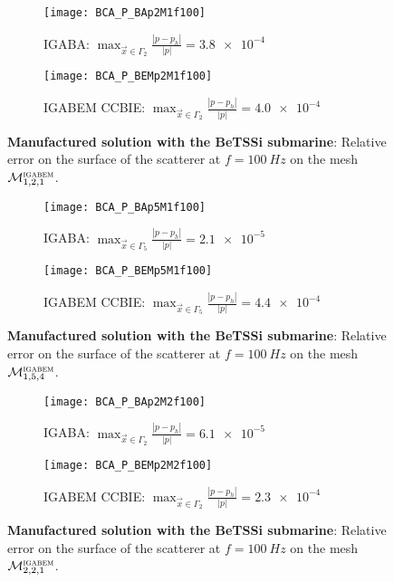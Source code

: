 \begin{figure}
	\centering
	\begin{subfigure}[t]{\textwidth}
		\texttt{[image: BCA\_P\_BAp2M1f100]}
		\caption{IGABA: $\displaystyle \max_{\vec{x}\in\Gamma_2}\frac{|p-p_h|}{|p|} = \num{3.8e-4}$}
	\end{subfigure} 
	\par\bigskip
	\begin{subfigure}[t]{\textwidth}
		\texttt{[image: BCA\_P\_BEMp2M1f100]}
		\caption{IGABEM CCBIE: $\displaystyle \max_{\vec{x}\in\Gamma_2}\frac{|p-p_h|}{|p|} = \num{4.0e-4}$}
	\end{subfigure} 
	\caption{\textbf{Manufactured solution with the BeTSSi submarine}: Relative error on the surface of the scatterer at $f=\SI{100}{Hz}$ on the mesh ${\cal M}_{1,2,1}^{\textsc{igabem}}$.}
	\label{Fig3:BCA_P_p2M1f100}
\end{figure}


\begin{figure}
	\centering
	\begin{subfigure}[t]{\textwidth}
		\texttt{[image: BCA\_P\_BAp5M1f100]}
		\caption{IGABA: $\displaystyle \max_{\vec{x}\in\Gamma_5}\frac{|p-p_h|}{|p|} = \num{2.1e-5}$}
	\end{subfigure} 
	\par\bigskip
	\begin{subfigure}[t]{\textwidth}
		\texttt{[image: BCA\_P\_BEMp5M1f100]}
		\caption{IGABEM CCBIE: $\displaystyle \max_{\vec{x}\in\Gamma_5}\frac{|p-p_h|}{|p|} = \num{4.4e-4}$}
	\end{subfigure} 
	\caption{\textbf{Manufactured solution with the BeTSSi submarine}: Relative error on the surface of the scatterer at $f=\SI{100}{Hz}$ on the mesh ${\cal M}_{1,5,4}^{\textsc{igabem}}$.}
	\label{Fig3:BCA_P_p5M1f100}
\end{figure}


\begin{figure}
	\centering
	\begin{subfigure}[t]{\textwidth}
		\texttt{[image: BCA\_P\_BAp2M2f100]}
		\caption{IGABA: $\displaystyle \max_{\vec{x}\in\Gamma_2}\frac{|p-p_h|}{|p|} = \num{6.1e-5}$}
	\end{subfigure} 
	\par\bigskip
	\begin{subfigure}[t]{\textwidth}
		\texttt{[image: BCA\_P\_BEMp2M2f100]}
		\caption{IGABEM CCBIE: $\displaystyle \max_{\vec{x}\in\Gamma_2}\frac{|p-p_h|}{|p|} = \num{2.3e-4}$}
	\end{subfigure} 
	\caption{\textbf{Manufactured solution with the BeTSSi submarine}: Relative error on the surface of the scatterer at $f=\SI{100}{Hz}$ on the mesh ${\cal M}_{2,2,1}^{\textsc{igabem}}$.}
	\label{Fig3:BCA_P_p2M2f100}
\end{figure}



